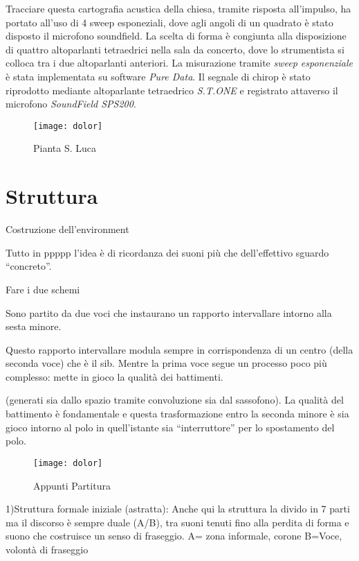 Tracciare questa cartografia acustica della chiesa, tramite risposta all'impulso,
ha portato all'uso di 4 sweep esponeziali, dove agli angoli di un quadrato è
stato disposto il microfono soundfield. La scelta di forma è congiunta alla
disposizione di quattro altoparlanti tetraedrici nella sala da concerto, dove
lo strumentista si colloca tra i due altoparlanti anteriori.
La misurazione  tramite \emph{sweep esponenziale} è stata implementata su software
\emph{Pure Data}. Il segnale di chirop è stato riprodotto mediante altoparlante
tetraedrico \emph{S.T.ONE} e registrato attaverso il microfono \emph{SoundField SPS200}.

\begin{figure}
\centering
{\texttt{[image: dolor]}}
\caption[Pianta S. Luca]{Pianta S. Luca}
\label{fig:tetratetra}
\end{figure}

\section*{Struttura}
\label{sec:struttura}

Costruzione dell'environment


Tutto in ppppp l'idea  è di ricordanza dei suoni più che dell'effettivo sguardo “concreto”.

Fare i due schemi

Sono partito da due voci che instaurano un rapporto intervallare intorno alla sesta minore.

Questo rapporto intervallare modula sempre in corrispondenza di un centro
(della seconda voce) che è il sib. Mentre  la prima voce segue un processo poco
più complesso: mette in gioco la qualità dei battimenti.

(generati sia dallo spazio tramite convoluzione sia dal sassofono).
La qualità del battimento è fondamentale e questa trasformazione entro la seconda
minore è sia gioco intorno al polo in quell'istante sia “interruttore” per
lo spostamento del polo.

\begin{figure}
\centering
{\texttt{[image: dolor]}}
\caption[Appunti Partitura]{Appunti Partitura}
\label{fig:tetratetra}
\end{figure}

1)Struttura formale iniziale (astratta):
Anche qui la struttura la divido in 7 parti ma il discorso è sempre duale (A/B),
tra suoni tenuti fino alla perdita di forma e suono che costruisce un senso di fraseggio.
A= zona informale, corone
B=Voce, volontà di fraseggio

